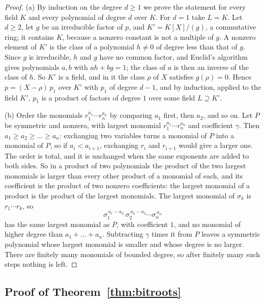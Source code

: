 \documentclass[11pt]{article}
\theoremstyle{plain}
\theoremstyle{definition}
\theoremstyle{plain}
\theoremstyle{definition}
\begin{document}
\begin{proof}
(a) By induction on the degree $d \geq 1$ we prove the statement for every field $K$ and every polynomial of degree $d$ over $K$. For $d = 1$ take $L = K$. Let $d \geq 2$, let $g$ be an irreducible factor of $p$, and $K' = K[X]/(g)$, a commutative ring; it contains $K$, because a nonzero constant is not a multiple of $g$. A nonzero element of $K'$ is the class of a polynomial $h \neq 0$ of degree less than that of $g$. Since $g$ is irreducible, $h$ and $g$ have no common factor, and Euclid's algorithm gives polynomials $a, b$ with $ah + bg = 1$; the class of $a$ is then an inverse of the class of $h$. So $K'$ is a field, and in it the class $\rho$ of $X$ satisfies $g(\rho) = 0$. Hence $p = (X - \rho)\,p_{1}$ over $K'$ with $p_{1}$ of degree $d - 1$, and by induction, applied to the field $K'$, $p_{1}$ is a product of factors of degree $1$ over some field $L \supseteq K'$.

(b) Order the monomials $r_{1}^{a_{1}} \cdots r_{n}^{a_{n}}$ by comparing $a_{1}$ first, then $a_{2}$, and so on. Let $P$ be symmetric and nonzero, with largest monomial $r_{1}^{a_{1}} \cdots r_{n}^{a_{n}}$ and coefficient $\gamma$. Then $a_{1} \geq a_{2} \geq \dots \geq a_{n}$: exchanging two variables turns a monomial of $P$ into a monomial of $P$, so if $a_{i} < a_{i+1}$, exchanging $r_{i}$ and $r_{i+1}$ would give a larger one. The order is total, and it is unchanged when the same exponents are added to both sides. So in a product of two polynomials the product of the two largest monomials is larger than every other product of a monomial of each, and its coefficient is the product of two nonzero coefficients: the largest monomial of a product is the product of the largest monomials. The largest monomial of $\sigma_{k}$ is $r_{1} \cdots r_{k}$, so
\[
\sigma_{1}^{\,a_{1} - a_{2}}\,\sigma_{2}^{\,a_{2} - a_{3}} \cdots \sigma_{n}^{\,a_{n}}
\]
has the same largest monomial as $P$, with coefficient $1$, and no monomial of higher degree than $a_{1} + \dots + a_{n}$. Subtracting $\gamma$ times it from $P$ leaves a symmetric polynomial whose largest monomial is smaller and whose degree is no larger. There are finitely many monomials of bounded degree, so after finitely many such steps nothing is left.
\end{proof}

\subsection{\texorpdfstring{Proof of Theorem~\ref{thm:bitroots}}{Proof of Theorem 6.3}}\label{prf:thm:bitroots}
\end{document}
